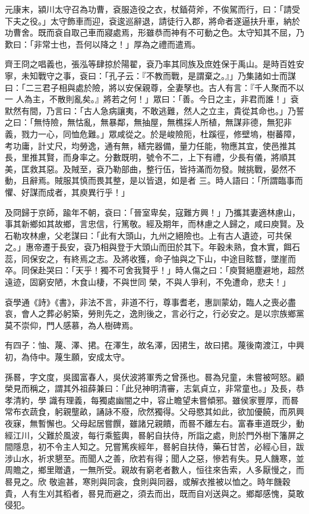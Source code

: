 \begin{pinyinscope}
 元康末，潁川太守召為功曹，袞服造役之衣，杖鍤荷斧，不俟駕而行，曰：「請受下夫之役。」太守飾車而迎，袞逡巡辭退，請徒行入郡，將命者遂逼扶升車，納於功曹舍。既而袞自取己車而寢處焉，形雖恭而神有不可動之色。太守知其不屈，乃歎曰：「非常士也，吾何以降之！」厚為之禮而遣焉。



 齊王冏之唱義也，張泓等肆掠於陽翟，袞乃率其同族及庶姓保于禹山。是時百姓安寧，未知戰守之事，袞曰：「孔子云：『不教而戰，是謂棄之。』」乃集諸如士而謀曰：「二三君子相與處於險，將以安保親尊，全妻孥也。古人有言：『千人聚而不以一
 人為主，不散則亂矣。』將若之何！」眾曰：「善。今日之主，非君而誰！」袞默然有間，乃言曰：「古人急病讓夷，不敢逃難，然人之立主，貴從其命也。」乃誓之曰：「無恃險，無怙亂，無暴鄰，無抽屋，無樵採人所植，無謀非德，無犯非義，戮力一心，同恤危難。」眾咸從之。於是峻險阨，杜蹊徑，修壁塢，樹蕃障，考功庸，計丈尺，均勞逸，通有無，繕完器備，量力任能，物應其宜，使邑推其長，里推其賢，而身率之。分數既明，號令不二，上下有禮，少長有儀，將順其美，匡救其惡。及賊至，袞乃勒部曲，整行伍，皆持滿而勿發。賊挑戰，晏然不動，且辭焉。賊服其慎而畏其整，是以皆退，如是者
 三。時人語曰：「所謂臨事而懼、好謀而成者，其庾異行乎！」



 及冏歸于京師，踰年不朝，袞曰：「晉室卑矣，寇難方興！」乃攜其妻適林慮山，事其新鄉如其故鄉，言忠信，行篤敬。經及期年，而林慮之人歸之，咸曰庾賢。及石勒攻林慮，父老謀曰：「此有大頭山，九州之絕險也。上有古人遺迹，可共保之。」惠帝遷于長安，袞乃相與登于大頭山而田於其下。年穀未熟，食木實，餌石蕊，同保安之，有終焉之志。及將收獲，命子怞與之下山，中途目眩瞀，墜崖而卒。同保赴哭曰：「天乎！獨不可舍我賢乎！」時人傷之曰：「庾賢絕塵避地，超然遠迹，固窮安陋，木食山棲，不與世同
 榮，不與人爭利，不免遭命，悲夫！」



 袞學通《詩》《書》，非法不言，非道不行，尊事耆老，惠訓蒙幼，臨人之喪必盡哀，會人之葬必躬築，勞則先之，逸則後之，言必行之，行必安之。是以宗族鄉黨莫不崇仰，門人感慕，為人樹碑焉。



 有四子：怞、蔑、澤、捃。在澤生，故名澤，因捃生，故曰捃。蔑後南渡江，中興初，為侍中。蔑生願，安成太守。



 孫晷，字文度，吳國富春人，吳伏波將軍秀之曾孫也。晷為兒童，未嘗被呵怒。顧榮見而稱之，謂其外祖薛兼曰：「此兒神明清審，志氣貞立，非常童也。」及長，恭孝清約，學
 識有理義，每獨處幽闇之中，容止瞻望未嘗傾邪。雖侯家豐厚，而晷常布衣蔬食，躬親壟畝，誦詠不廢，欣然獨得。父母愍其如此，欲加優饒，而夙興夜寐，無暫懈也。父母起居嘗饌，雖諸兄親饋，而晷不離左右。富春車道既少，動經江川，父難於風波，每行乘籃輿，晷躬自扶侍，所詣之處，則於門外樹下籓屏之間隱息，初不令主人知之。兄嘗篤疾經年，晷躬自扶侍，藥石甘苦，必經心目，跋涉山水，祈求懇至。而聞人之善，欣若有得；聞人之惡，慘若有失。見人饑寒，並周贍之，鄉里贈遺，一無所受。親故有窮老者數人，恒往來告索，人多厭慢之，而晷見之。欣
 敬逾甚，寒則與同衾，食則與同器，或解衣推被以恤之。時年饑穀貴，人有生刈其稻者，晷見而避之，須去而出，既而自刈送與之。鄉鄰感愧，莫敢侵犯。




\end{pinyinscope}
